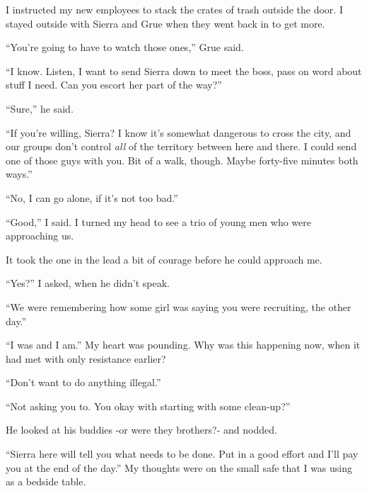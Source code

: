 I instructed my new employees to stack the crates of trash outside the door.  I stayed outside with Sierra and Grue when they went back in to get more.



``You're going to have to watch those ones,'' Grue said.



``I know.  Listen, I want to send Sierra down to meet the boss, pass on word about stuff I need.  Can you escort her part of the way?''



``Sure,'' he said.



``If you're willing, Sierra?  I know it's somewhat dangerous to cross the city, and our groups don't control \emph{all} of the territory between here and there.  I could send one of those guys with you.  Bit of a walk, though.  Maybe forty-five minutes both ways.''



``No, I can go alone, if it's not too bad.''



``Good,''  I said.  I turned my head to see a trio of young men who were approaching us.



It took the one in the lead a bit of courage before he could approach me.



``Yes?'' I asked, when he didn't speak.



``We were remembering how some girl was saying you were recruiting, the other day.''



``I was and I am.''  My heart was pounding.  Why was this happening now, when it had met with only resistance earlier?



``Don't want to do anything illegal.''



``Not asking you to.  You okay with starting with some clean-up?''



He looked at his buddies -or were they brothers?- and nodded.



``Sierra here will tell you what needs to be done.  Put in a good effort and I'll pay you at the end of the day.''  My thoughts were on the small safe that I was using as a bedside table.



